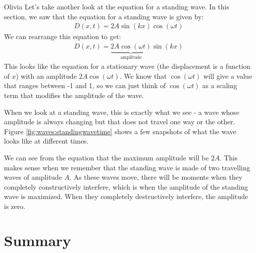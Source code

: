 \begin{studentOpinion}{Olivia}
Let's take another look at the equation for a standing wave. In this section, we saw that the equation for a standing wave is given by:
\begin{align*}
D(x,t)=2A\sin(kx)\cos(\omega t)
\end{align*}
We can rearrange this equation to get:
\begin{align*}
D(x,t)=\underbrace{2A\cos(\omega t)}_{\textrm{amplitude}}\sin(kx)
\end{align*}
This looks like the equation for a stationary wave (the displacement is a function of $x$) with an amplitude $2A\cos(\omega t)$. We know that $\cos(\omega t)$ will give a value that ranges between -1 and 1, so we can just think of $\cos(\omega t)$ as a scaling term that modifies the amplitude of the wave. 

When we look at a standing wave, this is exactly what we see - a wave whose amplitude is always changing but that does not travel one way or the other. Figure \ref{fig:waves:standingwavetime} shows a few snapshots of what the wave looks like at different times.


We can see from the equation that the maximum amplitude will be $2A$. This makes sense when we remember that the standing wave is made of two travelling waves of amplitude $A$. As these waves move, there will be moments when they completely constructively interfere, which is when the amplitude of the standing wave is maximized. When they completely destructively interfere, the amplitude is zero.
\end{studentOpinion}




\newpage
\section{Summary}

